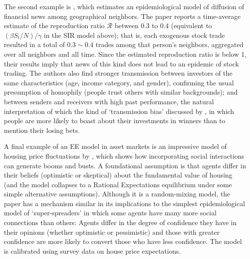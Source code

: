 The second example is \href{https://github.com/iworld1991/EpiExp/blob/master/Literature/huang2021rate.pdf}{ \cite{huang2021rate}}, which estimates an epidemiological model of diffusion of financial news among geographical neighbors. The paper reports a time-average estimate of the reproduction ratio $\mathcal{R}$ between $0.3$ to $0.4$ (equivalent to $(\beta S_t/N)/\gamma$ in the SIR model above); that is, each exogenous stock trade resulted in a total of $0.3{\sim}0.4$ trades among that person's neighbors, aggregated over all neighbors and all time.  Since the estimated reproduction ratio is below  1, their results imply that news of this kind does not lead to an epidemic of stock trading.    The authors also find stronger transmission between investors of the same characteristics (age, income category, and gender), confirming the usual presumption of homophily (people trust others with similar backgrounds); and between senders and receivers with high past performance, the natural interpretation of which the kind of `transmission bias' discussed by \cite{han2022social}, in which people are more likely to boast about their investments in winners than to mention their losing bets.

A final example of an EE model in asset markets is an impressive model of housing price fluctuations by \href{https://www.journals.uchicago.edu/doi/abs/10.1086/686732}{\cite{burnside_understanding_2016}}, which shows how incorporating social interactions can generate booms and busts. A foundational assumption is that agents differ in their beliefs (optimistic or skeptical) about the fundamental value of housing (and the model collapses to a Rational Expectations equilibrium under some simple alternative assumptions).  Although it is a random-mixing model, the paper has a mechanism similar in its implications to the simplest epidemiological model of `super-spreaders' in which some agents have many more social connections than others:  Agents differ in the degree of confidence they have in their opinions (whether optimistic or pessimistic) and those with greater confidence are more likely to convert those who have less confidence.  The model is calibrated using survey data on house price expectations.

